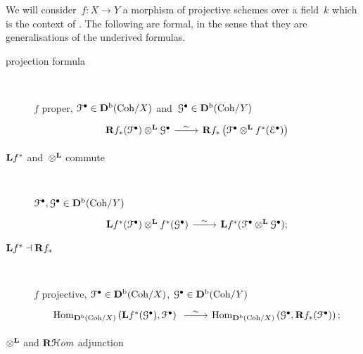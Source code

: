 \documentclass[10pt,a4paper]{article}
\begin{document}
We will consider~$f\colon X\to Y$ a morphism of projective schemes over a field~$k$ which is the context of \cite{huybrechts-fourier-mukai-transforms}. The following are formal, in the sense that they are generalisations of the underived formulas.
\begin{description}
  \item[projection formula] {\ }
    
    $f$ proper, $\mathcal{F}^\bullet\in\mathbf{D}^{\mathrm{b}}(\mathrm{Coh}/X)$ and~$\mathcal{G}^\bullet\in\mathbf{D}^{\mathrm{b}}(\mathrm{Coh}/Y)$
    \begin{equation}
      \begin{tikzcd}
        \RRR f_*(\mathcal{F}^\bullet)\otimes^\LLL\mathcal{G}^\bullet \arrow{r}{\sim} & \RRR f_*\left( \mathcal{F}^\bullet\otimes^\LLL f^*(\mathcal{E}^\bullet) \right)
      \end{tikzcd}
    \end{equation}

  \item[$\mathbf{L} f^*$ and~$\otimes^{\mathbf{L}}$ commute] {\ }
    
    $\mathcal{F}^\bullet,\mathcal{G}^\bullet\in\mathbf{D}^{\mathrm{b}}(\mathrm{Coh}/Y)$
    \begin{equation}
      \begin{tikzcd}
        \LLL f^*(\mathcal{F}^\bullet)\otimes^\LLL f^*(\mathcal{G}^\bullet) \arrow{r}{\sim} & \LLL f^*(\mathcal{F}^\bullet\otimes^\LLL\mathcal{G}^\bullet);
      \end{tikzcd}
    \end{equation}

  \item[$\mathbf{L} f^*\dashv\mathbf{R} f_*$] {\ }
    
    $f$ projective, $\mathcal{F}^\bullet\in\mathbf{D}^{\mathrm{b}}(\mathrm{Coh}/X)$, $\mathcal{G}^\bullet\in\mathbf{D}^{\mathrm{b}}(\mathrm{Coh}/Y)$
    \begin{equation}
      \begin{tikzcd}
        \Hom_{\derived^\bounded(\Coh/X)}\left( \LLL f^*(\mathcal{G}^\bullet),\mathcal{F}^\bullet \right) \arrow{r}{\sim} & \Hom_{\derived^\bounded(\Coh/X)}\left( \mathcal{G}^\bullet,\RRR f_*(\mathcal{F}^\bullet) \right);
      \end{tikzcd}
    \end{equation}

  \item[$\otimes^{\mathbf{L}}$ and $\operatorname{\mathbf{R}\mathcal{H}\mathit{om}}$ adjunction] {\ }
    

\end{description}
\end{document}
